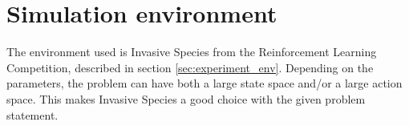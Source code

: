 \section{Simulation environment}
\label{sec:env_used}
The environment used is Invasive Species from the Reinforcement Learning Competition, described in section \ref{sec:experiment_env}. Depending on the parameters, the problem can have both a large state space and/or a large action space. This makes Invasive Species a good choice with the given problem statement.

